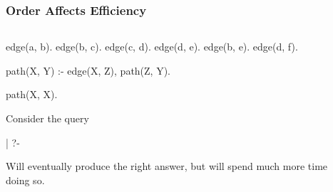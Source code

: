 \documentclass{plt}
\begin{document}
\begin{frame}[t,fragile]
  \frametitle{Order Affects Efficiency}

\begin{columns}
  \begin{column}[t]{0.4\textwidth}

\begin{prolog}
edge(a, b). edge(b, c).
edge(c, d). edge(d, e).
edge(b, e). edge(d, f).

path(X, Y) :-
    edge(X, Z), path(Z, Y).

path(X, X).
\end{prolog}

Consider the query

\begin{interactive}
| ?- 
\end{interactive}

Will eventually produce the right answer, but will spend much more
time doing so.

  \end{column}
\begin{column}[t]{0.5\textwidth}


\end{column}
\end{columns}

\end{frame}
\end{document}
